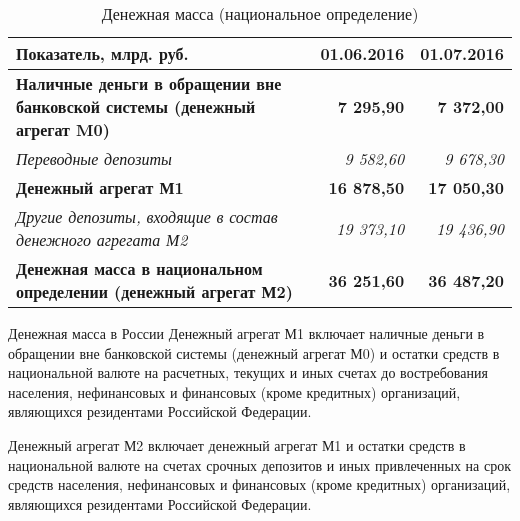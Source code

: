 \documentclass[_DKB_p1_Money.tex]{subfiles}
\begin{document}
\begin{frame}[shrink=15]
\begin{table}[htbp]
	\caption{Денежная масса (национальное определение)}
  \centering
  	\begin{tabularx}{\linewidth}[b]{@{}>{\raggedright\arraybackslash}Xrr@{}}
    \toprule
    \textbf{Показатель, млрд. руб.} & \textbf{01.06.2016} & \textbf{01.07.2016} \\
    \midrule
    \textbf{Наличные деньги в обращении вне банковской системы (денежный агрегат M0)} & \textbf{7 295,90} & \textbf{7 372,00} \\
    \textit{Переводные депозиты} & \textit{9 582,60} & \textit{9 678,30} \\
    \textbf{Денежный агрегат М1} & \textbf{16 878,50} & \textbf{17 050,30} \\
    \textit{Другие депозиты, входящие в состав денежного агрегата М2} & \textit{19 373,10} & \textit{19 436,90} \\
    \textbf{Денежная масса в национальном определении (денежный агрегат М2)} & \textbf{36 251,60} & \textbf{36 487,20} \\
    \bottomrule
    \end{tabularx}%
  \label{tab:addlabel}%
\end{table}%

\end{frame}

\begin{frame}{Денежная масса в России}
Денежный агрегат М1 включает наличные деньги в обращении вне банковской системы (денежный агрегат М0) и остатки средств в национальной валюте на расчетных, текущих и иных счетах до востребования населения, нефинансовых и финансовых (кроме кредитных) организаций, являющихся резидентами Российской Федерации.

Денежный агрегат М2 включает денежный агрегат М1 и остатки средств в национальной валюте на счетах срочных депозитов и иных привлеченных на срок средств населения, нефинансовых и финансовых (кроме кредитных) организаций, являющихся резидентами Российской Федерации.
\end{frame}
\end{document}
